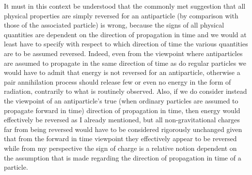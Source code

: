\documentclass[notitlepage,12pt]{report}
\begin{document}
It must in this context be understood that the commonly met suggestion that all physical properties are simply reversed for an antiparticle (by comparison with those of the associated particle) is wrong, because the signs of all physical quantities are dependent on the direction of propagation in time and we would at least have to specify with respect to which direction of time the various quantities are to be assumed reversed. Indeed, even from the viewpoint where antiparticles are assumed to propagate in the same direction of time as do regular particles we would have to admit that energy is not reversed for an antiparticle, otherwise a pair annihilation process should release few or even no energy in the form of radiation, contrarily to what is routinely observed. Also, if we do consider instead the viewpoint of an antiparticle's true (when ordinary particles are assumed to propagate forward in time) direction of propagation in time, then energy would effectively be reversed as I already mentioned, but all non-gravitational charges far from being reversed would have to be considered rigorously unchanged given that from the forward in time viewpoint they effectively appear to be reversed while from my perspective the sign of charge is a relative notion dependent on the assumption that is made regarding the direction of propagation in time of a particle.
\end{document}
